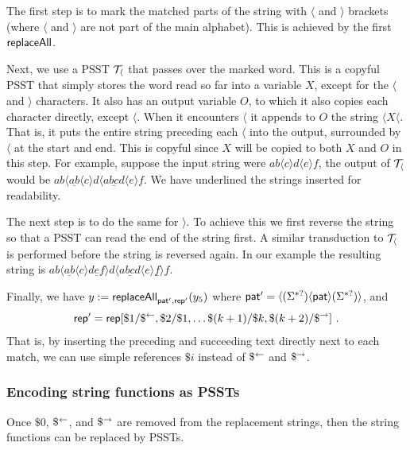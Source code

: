     The first step is to mark the matched parts of the string with $\langle$ and $\rangle$ brackets (where $\langle$ and $\rangle$ are not part of the main alphabet).
    This is achieved by the first $\mathsf{replaceAll}$.

    Next, we use a PSST $\mathcal{T}_{\langle}$ that passes over the marked word.
    This is a copyful PSST that simply stores the word read so far into a variable $X$, except for the $\langle$ and $\rangle$ characters.
    It also has an output variable $O$, to which it also copies each character directly, except $\langle$.
    When it encounters $\langle$ it appends to $O$ the string
    $\langle X \langle$.
    That is, it puts the entire string preceding each $\langle$ into the output, surrounded by $\langle$ at the start and end.
    This is copyful since $X$ will be copied to both $X$ and $O$ in this step.
    For example, suppose the input string were
    $a b \langle c \rangle d \langle e \rangle f$,
    the output of $\mathcal{T}_\langle$ would be
    $a b \langle \underline{a b} \langle c \rangle d \langle \underline{a b c d} \langle e \rangle f$.
    We have underlined the strings inserted for readability.

    The next step is to do the same for $\rangle$.
    To achieve this we first reverse the string so that a PSST can read the end of the string first.
    A similar transduction to $\mathcal{T}_\langle$ is performed before the string is reversed again.
    In our example the resulting string is
    $a b \langle \underline{a b} \langle c \rangle \underline{d e f} \rangle d \langle \underline{a b c d} \langle e \rangle \underline{f} \rangle f$.

    Finally, we have
    $y := \mathsf{replaceAll}_{\mathsf{pat}', \mathsf{rep}'}(y_5)$
    where
    $\mathsf{pat}' =
         \langle (\Sigma^{*?}) \langle
         \mathsf{pat}
         \rangle (\Sigma^{*?}) \rangle$, and
    \[
        \mathsf{rep}' = \mathsf{rep}[
            \$1 / \$^{\leftarrow},
            \$2 / \$1,
            \ldots
            \$(k+1) / \$k,
            \$(k+2) / \$^{\rightarrow}
        ] \ .
    \]
    That is, by inserting the preceding and succeeding text directly next to each match, we can use simple references $\$i$ instead of $\$^{\leftarrow}$ and $\$^{\rightarrow}$.

    \subsubsection{Encoding string functions as PSSTs}

    Once $\$0$, $\$^{\leftarrow}$, and $\$^{\rightarrow}$ are removed from the replacement strings, then the string functions can be replaced by PSSTs.

